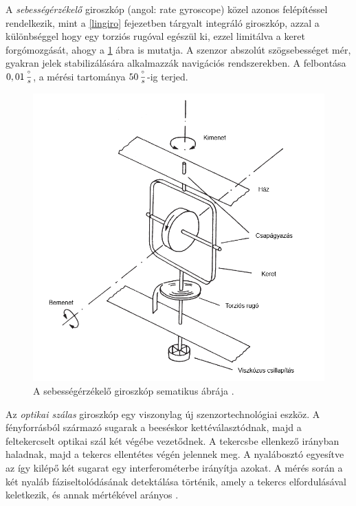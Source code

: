 A \textit{sebességérzékelő} giroszkóp (angol: rate gyroscope) közel azonos felépítéssel rendelkezik, mint a \ref{lingiro} fejezetben tárgyalt integráló giroszkóp, azzal a különbséggel hogy egy torziós rugóval egészül ki, ezzel limitálva a keret forgómozgását, ahogy a \ref{rategyro} ábra is mutatja. A szenzor abszolút szögsebességet mér, gyakran jelek stabilizálására alkalmazzák navigációs rendszerekben. A felbontása $0,01\,\frac{\degree}{s}$, a mérési tartománya $50\,\frac{\degree}{s}$-ig terjed.
\begin{figure}
	\centering
	\includegraphics[width=\columnwidth*7/10]{figures/rategyro.png}
	\caption{A sebességérzékelő giroszkóp sematikus ábrája \cite{Morris2016b}.}
	\label{rategyro}
\end{figure}
Az \textit{optikai szálas} giroszkóp egy viszonylag új szenzortechnológiai eszköz. A fényforrásból származó sugarak a beeséskor kettéválasztódnak, majd a feltekercselt optikai szál két végébe vezetődnek. A tekercsbe ellenkező irányban haladnak, majd a tekercs ellentétes végén jelennek meg. A nyalábosztó egyesítve az így kilépő két sugarat egy interferométerbe irányítja azokat. A mérés során a két nyaláb fáziseltolódásának detektálása történik, amely a tekercs elfordulásával keletkezik, és annak mértékével arányos \cite{Morris2016b}.

